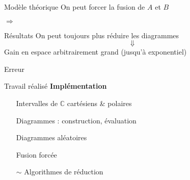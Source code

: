 \begin{frame}[noframenumbering]{Modèle théorique}
  On peut forcer la fusion de $A$ et $B$
  $\Rightarrow$
\end{frame}

\begin{frame}{Résultats}
  On peut toujours plus réduire les diagrammes
  $$\Downarrow$$
  Gain en espace arbitrairement grand (jusqu'à exponentiel)
\end{frame}

\begin{frame}{Erreur}
  
\end{frame}

\begin{frame}{Travail réalisé}
  \textbf{Implémentation}
  \begin{itemize}
      \item[\checkmark] Intervalles de $\mathbb C$ cartésiens \& polaires
      \item[\checkmark] Diagrammes : construction, évaluation
      \item[\checkmark] Diagrammes aléatoires
      \item[\checkmark] Fusion forcée
      \item[$\sim$] Algorithmes de réduction
  \end{itemize}
\end{frame}
